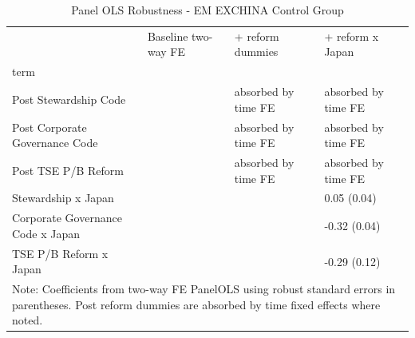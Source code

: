 \begin{table}
\caption{Panel OLS Robustness - EM EXCHINA Control Group}
\label{tab:robust_alt_em_exchina}
\begin{tabular}{llll}
\toprule
 & Baseline two-way FE & + reform dummies & + reform x Japan \\
term &  &  &  \\
\midrule
Post Stewardship Code &  & absorbed by time FE & absorbed by time FE \\
Post Corporate Governance Code &  & absorbed by time FE & absorbed by time FE \\
Post TSE P/B Reform &  & absorbed by time FE & absorbed by time FE \\
Stewardship x Japan &  &  & 0.05 (0.04) \\
Corporate Governance Code x Japan &  &  & -0.32 (0.04) \\
TSE P/B Reform x Japan &  &  & -0.29 (0.12) \\
\multicolumn{4}{l}{\footnotesize Note: Coefficients from two-way FE PanelOLS using robust standard errors in parentheses. Post reform dummies are absorbed by time fixed effects where noted.} \\
\bottomrule
\end{tabular}
\end{table}
